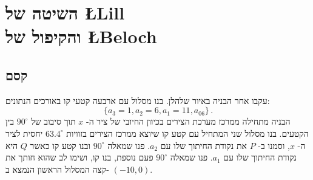 



\chapter[השיטה של
\L{Lill}
והקיפול של
\L{Beloch}]%
{השיטה של
\L{Lill}\\
והקיפול של
\L{Beloch}%
}\label{c.origami-cube}



\section{קסם}\label{s.magic}

עקבו אחר הבניה באיור שלהלן.
בנו מסלול עם ארבעה קטעי קו באורכים הנתונים:
\[
\{a_3=1,a_2=6,a_1=11,a_06\}\,.
\]
הבניה מתחילה ממרכז מערכת הצירים בכיוון החיובי של ציר ה-%
$x$
תוך סיבוב של
$90^\circ$
בין הקטעים. בנו מסלול שני המתחיל עם קטע קו שיוצא ממרכז הצירים בזוויות
$63.4^\circ$
יחסית לציר ה-%
$x$,
וסמנו ב-%
$P$ 
את נקודת החיתוך שלו עם
$a_2$.
פנו שמאלה 
$90^\circ$
ובנו קטע קו כאשר
$Q$
היא נקודת החיתוך שלו עם
$a_1$.
פנו שמאלה 
$90^\circ$
פעם נוספת, בנו קו, ושימו לב שהוא חותך את קצה המסלול הראשון הנמצא ב-%
$(-10,0)$.

